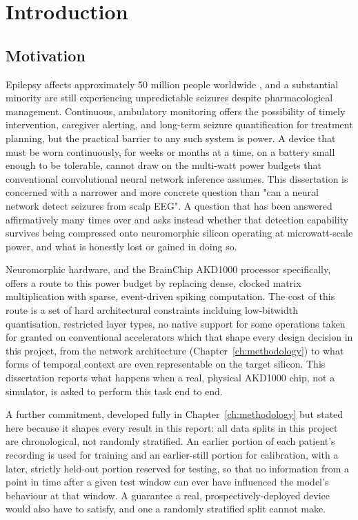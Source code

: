 \chapter{Introduction}
\label{ch:introduction}

\section{Motivation}

Epilepsy affects approximately 50 million people worldwide \citep{who2024epilepsy}, and a substantial minority are still experiencing unpredictable seizures despite 
pharmacological management. Continuous, ambulatory monitoring offers the possibility of timely intervention, caregiver alerting, and long-term seizure quantification for treatment 
planning, but the practical barrier to any such system is power. A device that must be worn continuously, for weeks or months at a time, on a battery small enough to be tolerable, 
cannot draw on the multi-watt power budgets that conventional convolutional neural network inference assumes. This dissertation is concerned with a narrower and more concrete question 
than "can a neural network detect seizures from scalp EEG". A question that has been answered affirmatively many times over and asks instead whether that detection capability 
survives being compressed onto neuromorphic silicon operating at microwatt-scale power, and what is honestly lost or gained in doing so.


Neuromorphic hardware, and the BrainChip AKD1000 processor specifically, offers a route to this power budget by replacing dense, clocked matrix multiplication with sparse, event-driven 
spiking computation. The cost of this route is a set of hard architectural constraints inclduing low-bitwidth quantisation, restricted layer types, no native support for some operations taken 
for granted on conventional accelerators which that shape every design decision in this project, from the network architecture (Chapter~\ref{ch:methodology}) to what forms of temporal 
context are even representable on the target silicon. This dissertation reports what happens when a real, physical AKD1000 chip, not a simulator, is asked to perform this task end to 
end.


A further commitment, developed fully in Chapter~\ref{ch:methodology} but stated here because it shapes every result in this report: all data splits in this project are 
chronological, not randomly stratified. An earlier portion of each patient's recording is used for training and an earlier-still portion for calibration, with a later, strictly 
held-out portion reserved for testing, so that no information from a point in time after a given test window can ever have influenced the model's behaviour at that window. A 
guarantee a real, prospectively-deployed device would also have to satisfy, and one a randomly stratified split cannot make.

